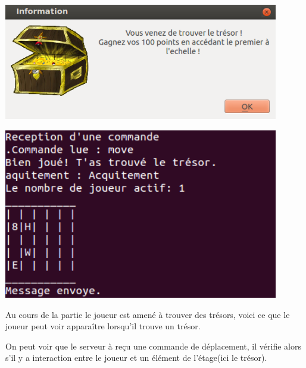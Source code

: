 \documentclass[a4paper,10pt]{article}
\begin{document}
		\begin{minipage}[t]{0.46\textwidth}
			\vspace{20pt}
			\centering
			\includegraphics[width=0.9\textwidth]{JeuxDEssais/Wumpus4.png}
		\end{minipage}
		\hfill
		\begin{minipage}[t]{0.46\textwidth}
			\vspace{2pt}
			\centering
			\includegraphics[width=0.9\textwidth]{JeuxDEssais/Serveur4.png}
		\end{minipage}

		\begin{minipage}[t]{0.46\textwidth}
			\vspace{2pt}
			Au cours de la partie le joueur est amené à trouver des trésors, voici ce que le joueur peut voir apparaître lorsqu'il trouve un trésor.
		\end{minipage}
		\hfill
		\begin{minipage}[t]{0.46\textwidth}
			\vspace{2pt}
			On peut voir que le serveur à reçu une commande de déplacement, il vérifie alors s'il y a interaction entre le joueur et un élément de l'étage(ici
le trésor).
		\end{minipage}\\

\end{document}
